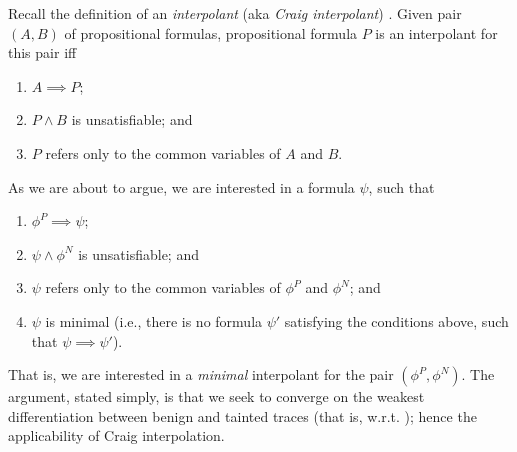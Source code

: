 \documentclass[]{article}
\newcommand{\ignore}[1]{}
\newcommand{\lsyn}{[\![}
\newcommand{\rsyn}{]\!]}
\newtheorem{defn}{Definition}
\begin{document}
\newcommand{\asgn}{\textnormal{$\mathbb{A}$}}
\newcommand{\asgnL}{\textnormal{$\mathbb{A}_L$}}
\newcommand{\asgnLP}{\textnormal{$\mathbb{A}_{L'}$}}

Recall the definition of an \emph{interpolant} (aka \emph{Craig interpolant}) \cite{XXX}. Given pair $(A,B)$ of propositional formulas, propositional formula $P$ is an interpolant for this pair iff
\begin{enumerate}
	\item $A \implies P$;
	\item $P \wedge B$ is unsatisfiable; and
	\item $P$ refers only to the common variables of $A$ and $B$.
\end{enumerate}

As we are about to argue, we are interested in a formula $\psi$, such that
\begin{enumerate}
	\item $\phi^P \implies \psi$;
	\item $\psi \wedge \phi^N$ is unsatisfiable; and
	\item $\psi$ refers only to the common variables of $\phi^P$ and $\phi^N$; and
	\item $\psi$ is minimal (i.e., there is no formula $\psi'$ satisfying the conditions above, such that $\psi \implies \psi'$).
\end{enumerate}
That is, we are interested in a \emph{minimal} interpolant for the pair $(\phi^P,\phi^N)$.
The argument, stated simply, is that we seek to converge on the weakest differentiation between benign and tainted traces (that is, w.r.t. \query{\xvar}{\yvar}); hence the applicability of Craig interpolation.

\ignore{
\begin{defn}[The optimality order] Let $\psi$ be a formula ranging over set $L$ of atoms, and $\psi'$ another formula. We define partial order $\prec$, such that $\psi' \prec \psi$ if the following three conditions hold:
	\item $\psi'$ ranges over set $L' \subseteq L$ of atoms.
	\item Any assignment \asgnLP\ to the literals $L'$ such that $\lsyn \psi' \rsyn_{\asgnLP}$ can be completed into an assignment \asgnL\ to the literals $L$ such that $\lsyn \psi \rsyn_{\asgnL}$.
	\item For any assignment \asgnLP\ to the literals $L'$ such that $\neg \lsyn \psi' \rsyn_{\asgnLP}$, there is no assignment \asgnL\ to the literals $L$ that is a completion of \asgnLP\ such that $\lsyn \psi \rsyn_{\asgnL}$.
\end{defn}
}
\end{document}
